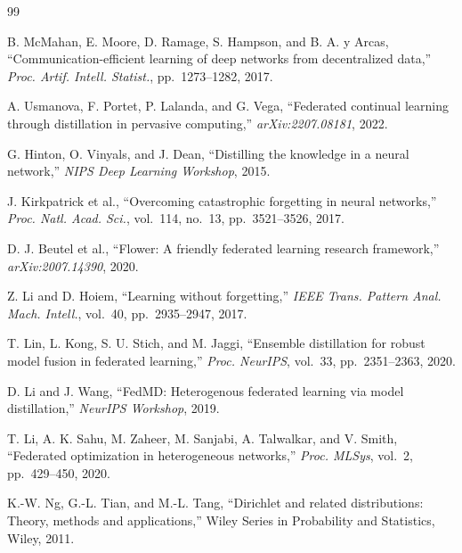\documentclass[journal]{IEEEtran}
\begin{document}

\begin{thebibliography}{99}

B. McMahan, E. Moore, D. Ramage, S. Hampson, and B. A. y Arcas,
``Communication-efficient learning of deep networks from decentralized data,''
\textit{Proc. Artif. Intell. Statist.}, pp.\ 1273--1282, 2017.

A. Usmanova, F. Portet, P. Lalanda, and G. Vega,
``Federated continual learning through distillation in pervasive computing,''
\textit{arXiv:2207.08181}, 2022.

G. Hinton, O. Vinyals, and J. Dean,
``Distilling the knowledge in a neural network,''
\textit{NIPS Deep Learning Workshop}, 2015.

J. Kirkpatrick et al.,
``Overcoming catastrophic forgetting in neural networks,''
\textit{Proc. Natl. Acad. Sci.}, vol.\ 114, no.\ 13, pp.\ 3521--3526, 2017.

D. J. Beutel et al.,
``Flower: A friendly federated learning research framework,''
\textit{arXiv:2007.14390}, 2020.

Z. Li and D. Hoiem,
``Learning without forgetting,''
\textit{IEEE Trans. Pattern Anal. Mach. Intell.}, vol.\ 40, pp.\ 2935--2947, 2017.

T. Lin, L. Kong, S. U. Stich, and M. Jaggi,
``Ensemble distillation for robust model fusion in federated learning,''
\textit{Proc. NeurIPS}, vol.\ 33, pp.\ 2351--2363, 2020.

D. Li and J. Wang,
``FedMD: Heterogenous federated learning via model distillation,''
\textit{NeurIPS Workshop}, 2019.

T. Li, A. K. Sahu, M. Zaheer, M. Sanjabi, A. Talwalkar, and V. Smith,
``Federated optimization in heterogeneous networks,''
\textit{Proc. MLSys}, vol.\ 2, pp.\ 429--450, 2020.

K.-W. Ng, G.-L. Tian, and M.-L. Tang,
``Dirichlet and related distributions: Theory, methods and applications,''
Wiley Series in Probability and Statistics, Wiley, 2011.

\end{thebibliography}
\end{document}
